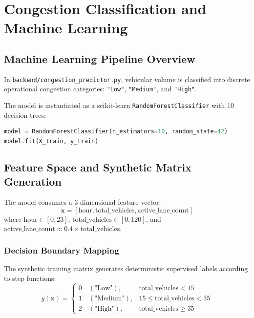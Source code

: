 \chapter{Congestion Classification and Machine Learning}

\section{Machine Learning Pipeline Overview}
In \texttt{backend/congestion\_predictor.py}, vehicular volume is classified into discrete operational congestion categories: \texttt{"Low"}, \texttt{"Medium"}, and \texttt{"High"}.

The model is instantiated as a scikit-learn \texttt{RandomForestClassifier} with 10 decision trees:
\begin{lstlisting}[language=Python]
model = RandomForestClassifier(n_estimators=10, random_state=42)
model.fit(X_train, y_train)
\end{lstlisting}

\section{Feature Space and Synthetic Matrix Generation}
The model consumes a 3-dimensional feature vector:
\begin{equation}
\mathbf{x} = \left[ \text{hour}, \text{total\_vehicles}, \text{active\_lane\_count} \right]
\end{equation}
where $\text{hour} \in [0, 23]$, $\text{total\_vehicles} \in [0, 120]$, and $\text{active\_lane\_count} \approx 0.4 \times \text{total\_vehicles}$.

\subsection{Decision Boundary Mapping}
The synthetic training matrix generates deterministic supervised labels according to step functions:
\begin{equation}
y(\mathbf{x}) =
\begin{cases}
0 \quad (\text{"Low"}), & \text{total\_vehicles} < 15 \\
1 \quad (\text{"Medium"}), & 15 \le \text{total\_vehicles} < 35 \\
2 \quad (\text{"High"}), & \text{total\_vehicles} \ge 35
\end{cases}
\end{equation}

